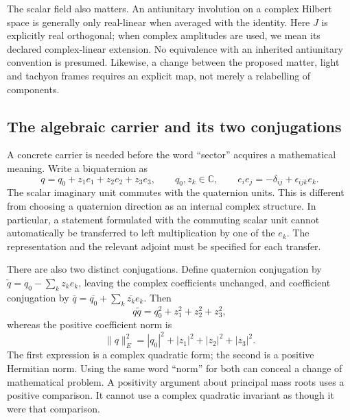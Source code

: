 \documentclass[11pt,a4paper]{article}
\begin{document}
The scalar field also matters. An antiunitary involution on a complex
Hilbert space is generally only real-linear when averaged with the
identity. Here $J$ is explicitly real orthogonal; when complex amplitudes
are used, we mean its declared complex-linear extension. No equivalence
with an inherited antiunitary convention is presumed. Likewise, a change
between the proposed matter, light and tachyon frames requires an
explicit map, not merely a relabelling of components.
\subsection{The algebraic carrier and its two conjugations}
A concrete carrier is needed before the word ``sector'' acquires a
mathematical meaning. Write a biquaternion as
\begin{equation}
 q=q_0+z_1e_1+z_2e_2+z_3e_3,\qquad q_0,z_k\in\mathbb C,
 \qquad e_ie_j=-\delta_{ij}+\epsilon_{ijk}e_k.
\end{equation}
The scalar imaginary unit commutes with the quaternion units. This is
different from choosing a quaternion direction as an internal complex
structure. In particular, a statement formulated with the commuting
scalar unit cannot automatically be transferred to left multiplication
by one of the $e_k$. The representation and the relevant adjoint must
be specified for each transfer.

There are also two distinct conjugations. Define quaternion conjugation
by $\widetilde q=q_0-\sum_kz_ke_k$, leaving the complex coefficients
unchanged, and coefficient conjugation by
$\overline q=\overline{q_0}+\sum_k\overline{z_k}e_k$. Then
\begin{equation}
 q\widetilde q=q_0^2+z_1^2+z_2^2+z_3^2,
\end{equation}
whereas the positive coefficient norm is
\begin{equation}
 \|q\|_E^2=|q_0|^2+|z_1|^2+|z_2|^2+|z_3|^2.
\end{equation}
The first expression is a complex quadratic form; the second is a
positive Hermitian norm. Using the same word ``norm'' for both can
conceal a change of mathematical problem. A positivity argument about
principal mass roots uses a positive comparison. It cannot use a
complex quadratic invariant as though it were that comparison.
\end{document}
